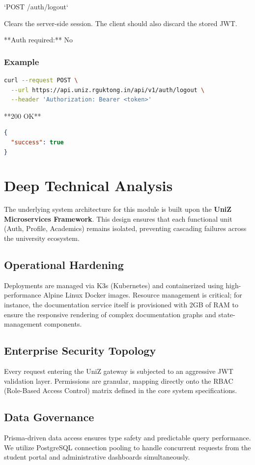 `POST /auth/logout`

Clears the server-side session. The client should also discard the stored JWT.

**Auth required:** No

\subsubsection{Example}

\begin{lstlisting}[language=bash]
curl --request POST \
  --url https://api.uniz.rguktong.in/api/v1/auth/logout \
  --header 'Authorization: Bearer <token>'

\end{lstlisting}

**200 OK**

\begin{lstlisting}[language=json]
{
  "success": true
}

\end{lstlisting}


\section{Deep Technical Analysis}
The underlying system architecture for this module is built upon the \textbf{UniZ Microservices Framework}. 
This design ensures that each functional unit (Auth, Profile, Academics) remains isolated, preventing cascading failures across the university ecosystem.

\subsection{Operational Hardening}
Deployments are managed via K3s (Kubernetes) and containerized using high-performance Alpine Linux Docker images. 
Resource management is critical; for instance, the documentation service itself is provisioned with 2GB of RAM to ensure the responsive rendering of complex documentation graphs and state-management components.

\subsection{Enterprise Security Topology}
Every request entering the UniZ gateway is subjected to an aggressive JWT validation layer. 
Permissions are granular, mapping directly onto the RBAC (Role-Based Access Control) matrix defined in the core system specifications.

\subsection{Data Governance}
Prisma-driven data access ensures type safety and predictable query performance. 
We utilize PostgreSQL connection pooling to handle concurrent requests from the student portal and administrative dashboards simultaneously.
